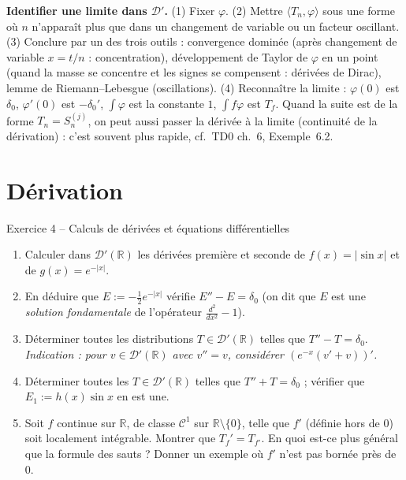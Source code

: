 \documentclass[11pt,a4paper]{article}
\newcommand{\R}{\mathbb{R}}
\newcommand{\D}{\mathcal{D}}
\theoremstyle{definition}
\begin{document}
\begin{methode}
\textbf{Identifier une limite dans $\D'$.} (1) Fixer $\varphi$. (2) Mettre $\langle T_n,\varphi\rangle$ sous une forme où $n$ n'apparaît plus que dans un changement de variable ou un facteur oscillant. (3) Conclure par un des trois outils : convergence dominée (après changement de variable $x=t/n$ : concentration), développement de Taylor de $\varphi$ en un point (quand la masse se concentre et les signes se compensent : dérivées de Dirac), lemme de Riemann--Lebesgue (oscillations). (4) Reconnaître la limite : $\varphi(0)$ est $\delta_0$, $\varphi'(0)$ est $-\delta_0'$, $\int\varphi$ est la constante $1$, $\int f\varphi$ est $T_f$. Quand la suite est de la forme $T_n=S_n^{(j)}$, on peut aussi passer la dérivée à la limite (continuité de la dérivation) : c'est souvent plus rapide, cf.\ TD0 ch.~6, Exemple~6.2.
\end{methode}

\section*{Dérivation}

\begin{exo}{Exercice 4 -- Calculs de dérivées et équations différentielles}
\begin{enumerate}[label=(\alph*)]
  \item Calculer dans $\D'(\R)$ les dérivées première et seconde de $f(x)=|\sin x|$ et de $g(x)=e^{-|x|}$.
  \item En déduire que $E:=-\frac12e^{-|x|}$ vérifie $E''-E=\delta_0$ (on dit que $E$ est une \emph{solution fondamentale} de l'opérateur $\frac{d^2}{dx^2}-1$).
  \item Déterminer toutes les distributions $T\in\D'(\R)$ telles que $T''-T=\delta_0$. \emph{Indication : pour $v\in\D'(\R)$ avec $v''=v$, considérer $(e^{-x}(v'+v))'$.}
  \item Déterminer toutes les $T\in\D'(\R)$ telles que $T''+T=\delta_0$ ; vérifier que $E_1:=h(x)\sin x$ en est une.
  \item Soit $f$ continue sur $\R$, de classe $\mathcal C^1$ sur $\R\setminus\{0\}$, telle que $f'$ (définie hors de $0$) soit localement intégrable. Montrer que $T_f'=T_{f'}$. En quoi est-ce plus général que la formule des sauts ? Donner un exemple où $f'$ n'est pas bornée près de $0$.
\end{enumerate}
\end{exo}
\end{document}
